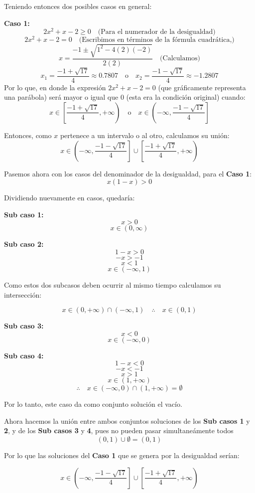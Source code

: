 \documentclass{article}
\begin{document}
\begin{enumerate}
Teniendo entonces dos posibles casos en general:

\textbf{Caso 1:}
\[
2x^2 + x - 2 \geq 0 \quad \text{(Para el numerador de la desigualdad)}
\]
\[
2x^2 + x - 2 = 0 \quad \text{(Escribimos en términos de la fórmula cuadrática,)}
\]
\[
x = \frac{-1 \pm \sqrt{1^2 - 4(2)(-2)}}{2(2)} \quad \text{(Calculamos)}
\]
\[
x_1 = \frac{-1 + \sqrt{17}}{4} \approx 0.7807 \quad \text{o} \quad x_2 = \frac{-1 - \sqrt{17}}{4} \approx -1.2807
\]
Por lo que, en donde la expresión \(2x^2 + x - 2 = 0\) (que gráficamente representa una parábola) será mayor o igual que 0 (esta era la condición original) cuando:
\[
x \in \left[ \frac{-1 + \sqrt{17}}{4}, +\infty \right) \quad \text{o} \quad x \in \left(-\infty, \frac{-1 - \sqrt{17}}{4}\right]
\]

Entonces, como \(x\) pertenece a un intervalo o al otro, calculamos su unión:
\[
x \in \left(-\infty, \frac{-1 - \sqrt{17}}{4}\right] \cup \left[\frac{-1 + \sqrt{17}}{4}, +\infty\right)
\]

Pasemos ahora con los casos del denominador de la desigualdad, para el \textbf{Caso 1}:
\[
x(1-x) > 0
\]

Dividiendo nuevamente en casos, quedaría:

\textbf{Sub caso 1:}
\[
x > 0
\]
\[
x \in (0, \infty)
\]

\textbf{Sub caso 2:}
\[
1-x > 0
\]
\[
-x > -1
\]
\[
x < 1
\]
\[
x \in (-\infty, 1)
\]

Como estos dos subcasos deben ocurrir al mismo tiempo calculamos su intersección:

\[
x \in (0, +\infty) \cap (-\infty, 1) \quad \therefore \quad x \in (0, 1)
\]

\textbf{Sub caso 3:}
\[
x < 0
\]
\[
x \in (-\infty, 0)
\]

\textbf{Sub caso 4:}
\[
1-x < 0
\]
\[
-x < -1
\]
\[
x > 1
\]
\[
x \in (1, +\infty)
\]
\[
\therefore \quad x \in (-\infty, 0) \cap (1, +\infty) = \emptyset
\]

Por lo tanto, este caso da como conjunto solución el vacío.

Ahora hacemos la unión entre ambos conjuntos soluciones de los \textbf{Sub casos 1} y \textbf{2}, y de los \textbf{Sub casos 3} y \textbf{4}, pues no pueden pasar simultaneámente todos
\[
(0,1) \cup \emptyset = (0,1)
\]

Por lo que las soluciones del \textbf{Caso 1} que se genera por la desigualdad serían:

\[
x \in \left(-\infty, \frac{-1 - \sqrt{17}}{4}\right] \cup \left[\frac{-1 + \sqrt{17}}{4}, +\infty\right)
\]


\end{enumerate}
\end{document}
